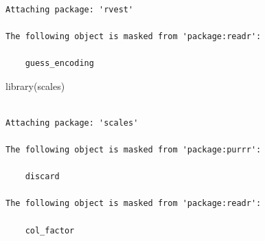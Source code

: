 \documentclass[
  letterpaper,
  DIV=11,
  numbers=noendperiod]{scrartcl}
\newenvironment{Shaded}{\begin{snugshade}}{\end{snugshade}}
\newcommand{\FunctionTok}[1]{\textcolor[rgb]{0.28,0.35,0.67}{#1}}
\newcommand{\NormalTok}[1]{\textcolor[rgb]{0.00,0.23,0.31}{#1}}
\begin{document}
\begin{verbatim}

Attaching package: 'rvest'

The following object is masked from 'package:readr':

    guess_encoding
\end{verbatim}

\begin{Shaded}
\begin{Highlighting}[]
\FunctionTok{library}\NormalTok{(scales)}
\end{Highlighting}
\end{Shaded}

\begin{verbatim}

Attaching package: 'scales'

The following object is masked from 'package:purrr':

    discard

The following object is masked from 'package:readr':

    col_factor
\end{verbatim}
\end{document}
